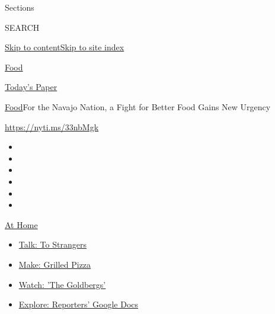 Sections

SEARCH

\protect\hyperlink{site-content}{Skip to
content}\protect\hyperlink{site-index}{Skip to site index}

\href{https://www.nytimes3xbfgragh.onion/section/food}{Food}

\href{https://myaccount.nytimes3xbfgragh.onion/auth/login?response_type=cookie\&client_id=vi}{}

\href{https://www.nytimes3xbfgragh.onion/section/todayspaper}{Today's
Paper}

\href{/section/food}{Food}\textbar{}For the Navajo Nation, a Fight for
Better Food Gains New Urgency

\url{https://nyti.ms/33nbMgk}

\begin{itemize}
\item
\item
\item
\item
\item
\item
\end{itemize}

\href{https://www.nytimes3xbfgragh.onion/spotlight/at-home?action=click\&pgtype=Article\&state=default\&region=TOP_BANNER\&context=at_home_menu}{At
Home}

\begin{itemize}
\tightlist
\item
  \href{https://www.nytimes3xbfgragh.onion/2020/08/03/well/family/the-benefits-of-talking-to-strangers.html?action=click\&pgtype=Article\&state=default\&region=TOP_BANNER\&context=at_home_menu}{Talk:
  To Strangers}
\item
  \href{https://www.nytimes3xbfgragh.onion/2020/08/01/at-home/coronavirus-make-pizza-on-a-grill.html?action=click\&pgtype=Article\&state=default\&region=TOP_BANNER\&context=at_home_menu}{Make:
  Grilled Pizza}
\item
  \href{https://www.nytimes3xbfgragh.onion/2020/07/31/arts/television/goldbergs-abc-stream.html?action=click\&pgtype=Article\&state=default\&region=TOP_BANNER\&context=at_home_menu}{Watch:
  'The Goldbergs'}
\item
  \href{https://www.nytimes3xbfgragh.onion/interactive/2020/at-home/even-more-reporters-editors-diaries-lists-recommendations.html?action=click\&pgtype=Article\&state=default\&region=TOP_BANNER\&context=at_home_menu}{Explore:
  Reporters' Google Docs}
\end{itemize}

